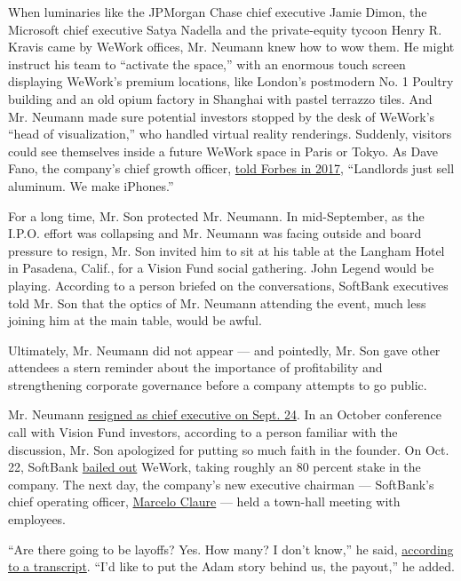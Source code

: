 When luminaries like the JPMorgan Chase chief executive Jamie Dimon, the
Microsoft chief executive Satya Nadella and the private-equity tycoon
Henry R. Kravis came by WeWork offices, Mr. Neumann knew how to wow
them. He might instruct his team to ``activate the space,'' with an
enormous touch screen displaying WeWork's premium locations, like
London's postmodern No. 1 Poultry building and an old opium factory in
Shanghai with pastel terrazzo tiles. And Mr. Neumann made sure potential
investors stopped by the desk of WeWork's ``head of visualization,'' who
handled virtual reality renderings. Suddenly, visitors could see
themselves inside a future WeWork space in Paris or Tokyo. As Dave Fano,
the company's chief growth officer,
\href{https://www.forbes.com/sites/stevenbertoni/2017/10/02/the-way-we-work/\#e17b9fe1b181}{told
Forbes in 2017}, ``Landlords just sell aluminum. We make iPhones.''

For a long time, Mr. Son protected Mr. Neumann. In mid-September, as the
I.P.O. effort was collapsing and Mr. Neumann was facing outside and
board pressure to resign, Mr. Son invited him to sit at his table at the
Langham Hotel in Pasadena, Calif., for a Vision Fund social gathering.
John Legend would be playing. According to a person briefed on the
conversations, SoftBank executives told Mr. Son that the optics of Mr.
Neumann attending the event, much less joining him at the main table,
would be awful.

Ultimately, Mr. Neumann did not appear --- and pointedly, Mr. Son gave
other attendees a stern reminder about the importance of profitability
and strengthening corporate governance before a company attempts to go
public.

Mr. Neumann
\href{https://www.nytimes3xbfgragh.onion/2019/09/24/business/dealbook/wework-ceo-adam-neumann.html}{resigned
as chief executive on Sept. 24}. In an October conference call with
Vision Fund investors, according to a person familiar with the
discussion, Mr. Son apologized for putting so much faith in the founder.
On Oct. 22, SoftBank
\href{https://group.softbank/en/corp/set/data/news/press/sb/2019/20191023_01/pdf/20191023_01.pdf}{bailed
out} WeWork, taking roughly an 80 percent stake in the company. The next
day, the company's new executive chairman --- SoftBank's chief operating
officer,
\href{https://www.nytimes3xbfgragh.onion/reuters/2019/10/23/business/23reuters-wework-chairman-workers.html}{Marcelo
Claure} --- held a town-hall meeting with employees.

``Are there going to be layoffs? Yes. How many? I don't know,'' he said,
\href{https://www.vox.com/2019/10/24/20929236/wework-layoffs-adam-neumann-marcelo-claure}{according
to a transcript}. ``I'd like to put the Adam story behind us, the
payout,'' he added.

